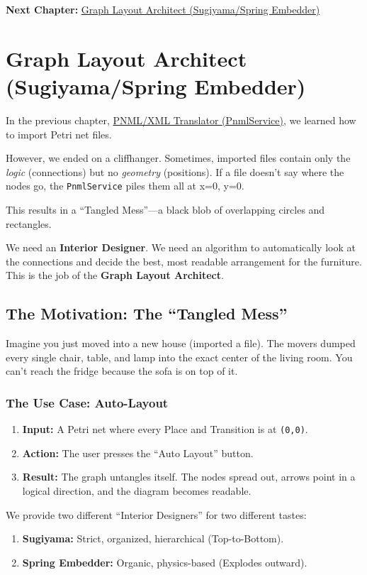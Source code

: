 \documentclass[a4paper,11pt,oneside]{report}
\begin{document}
\textbf{Next Chapter:} \hyperref[chap:layout]{Graph Layout Architect (Sugiyama/Spring Embedder)}

\chapter{Graph Layout Architect (Sugiyama/Spring Embedder)}
\label{chap:layout}

In the previous chapter, \hyperref[chap:pnmlservice]{PNML/XML Translator (PnmlService)}, we learned how to import Petri net files.

However, we ended on a cliffhanger. Sometimes, imported files contain only the \emph{logic} (connections) but no \emph{geometry} (positions). If a file doesn't say where the nodes go, the \texttt{PnmlService} piles them all at x=0, y=0.

This results in a ``Tangled Mess''---a black blob of overlapping circles and rectangles.

We need an \textbf{Interior Designer}. We need an algorithm to automatically look at the connections and decide the best, most readable arrangement for the furniture. This is the job of the \textbf{Graph Layout Architect}.

\section{The Motivation: The ``Tangled Mess''}

Imagine you just moved into a new house (imported a file). The movers dumped every single chair, table, and lamp into the exact center of the living room. You can't reach the fridge because the sofa is on top of it.

\subsection{The Use Case: Auto-Layout}

\begin{enumerate}
    \item \textbf{Input:} A Petri net where every Place and Transition is at \texttt{(0,0)}.
    \item \textbf{Action:} The user presses the ``Auto Layout'' button.
    \item \textbf{Result:} The graph untangles itself. The nodes spread out, arrows point in a logical direction, and the diagram becomes readable.
\end{enumerate}

We provide two different ``Interior Designers'' for two different tastes:
\begin{enumerate}
    \item \textbf{Sugiyama:} Strict, organized, hierarchical (Top-to-Bottom).
    \item \textbf{Spring Embedder:} Organic, physics-based (Explodes outward).
\end{enumerate}
\end{document}
